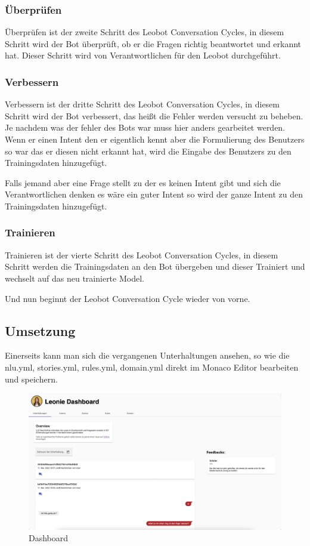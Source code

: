 \subsubsection{Überprüfen}
Überprüfen ist der zweite Schritt des Leobot Conversation Cycles, in diesem Schritt wird der Bot überprüft, ob er die Fragen richtig beantwortet und erkannt hat.
Dieser Schritt wird von Verantwortlichen für den Leobot durchgeführt.

\subsubsection{Verbessern}
Verbessern ist der dritte Schritt des Leobot Conversation Cycles, in diesem Schritt wird der Bot verbessert, das heißt die Fehler werden versucht zu beheben.
Je nachdem was der fehler des Bots war muss hier anders gearbeitet werden.
Wenn er einen Intent den er eigentlich kennt aber die Formulierung des Benutzers so war das er diesen nicht erkannt hat, wird die Eingabe des Benutzers zu den Trainingsdaten hinzugefügt.

Falls jemand aber eine Frage stellt zu der es keinen Intent gibt und sich die Verantwortlichen denken es wäre ein guter Intent so wird der ganze Intent zu den Trainingsdaten hinzugefügt.

\subsubsection{Trainieren}
Trainieren ist der vierte Schritt des Leobot Conversation Cycles, in diesem Schritt werden die Trainingsdaten an den Bot übergeben und dieser Trainiert und wechselt auf das neu trainierte Model.

Und nun beginnt der Leobot Conversation Cycle wieder von vorne.

\subsection{Umsetzung}

Einerseits kann man sich die vergangenen Unterhaltungen ansehen, so wie die nlu.yml, stories.yml, rules.yml, domain.yml direkt im Monaco Editor bearbeiten und speichern.

\begin{figure}[hbt!]
    \centering
    \includegraphics[scale=0.2]{pics/dashboardConvo}
    \caption{Dashboard}
    \label{fig:impl:dashConv}
\end{figure}

